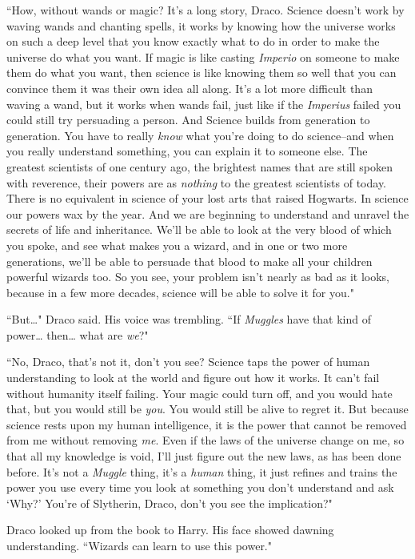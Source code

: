``How, without wands or magic? It's a long story, Draco. Science doesn't work by waving wands and chanting spells, it works by knowing how the universe works on such a deep level that you know exactly what to do in order to make the universe do what you want. If magic is like casting \emph{Imperio} on someone to make them do what you want, then science is like knowing them so well that you can convince them it was their own idea all along. It's a lot more difficult than waving a wand, but it works when wands fail, just like if the \emph{Imperius} failed you could still try persuading a person. And Science builds from generation to generation. You have to really \emph{know} what you're doing to do science\---and when you really understand something, you can explain it to someone else. The greatest scientists of one century ago, the brightest names that are still spoken with reverence, their powers are as \emph{nothing} to the greatest scientists of today. There is no equivalent in science of your lost arts that raised Hogwarts. In science our powers wax by the year. And we are beginning to understand and unravel the secrets of life and inheritance. We'll be able to look at the very blood of which you spoke, and see what makes you a wizard, and in one or two more generations, we'll be able to persuade that blood to make all your children powerful wizards too. So you see, your problem isn't nearly as bad as it looks, because in a few more decades, science will be able to solve it for you."

``But{\ldots}" Draco said. His voice was trembling. ``If \emph{Muggles} have that kind of power{\ldots} then{\ldots} what are \emph{we}?"

``No, Draco, that's not it, don't you see? Science taps the power of human understanding to look at the world and figure out how it works. It can't fail without humanity itself failing. Your magic could turn off, and you would hate that, but you would still be \emph{you}. You would still be alive to regret it. But because science rests upon my human intelligence, it is the power that cannot be removed from me without removing \emph{me}. Even if the laws of the universe change on me, so that all my knowledge is void, I'll just figure out the new laws, as has been done before. It's not a \emph{Muggle} thing, it's a \emph{human} thing, it just refines and trains the power you use every time you look at something you don't understand and ask `Why?' You're of Slytherin, Draco, don't you see the implication?"

Draco looked up from the book to Harry. His face showed dawning understanding. ``Wizards can learn to use this power."

